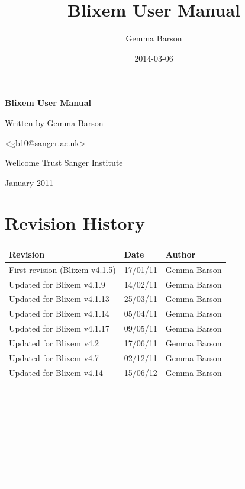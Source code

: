 \documentclass[letterpaper]{article}
\title{Blixem User Manual}
\author{Gemma Barson}
\date{2014-03-06}
\begin{document}
\setcounter{page}{1}\pagestyle{Standard}


\thispagestyle{FirstPage}
{\centering\sffamily\bfseries\color[rgb]{0.0,0.27058825,0.5254902}
\Huge\bf{Blixem User Manual}
\par}

\bigskip

{\centering
\large{Written by Gemma Barson}
\par}
{\centering
{\textless}\href{mailto:gb10@sanger.ac.uk}{gb10@sanger.ac.uk}{\textgreater}
\par}

\bigskip

{\centering
\large{Wellcome Trust Sanger Institute}
\par}
{ January 2011
\par}



\clearpage
{\color[rgb]{0.0,0.27058825,0.5254902}\section[Revision History]{Revision History}}
\hypertarget{RefHeading334316266717}{}
\bigskip

\begin{center}
\tablehead{}
\begin{supertabular}{|m{8.073cm}|m{3.2849998cm}|m{3.282cm}|}
\hline
\bfseries Revision &
\bfseries Date &
\bfseries Author\\\hline
 First revision (Blixem v4.1.5) &
 17/01/11 &
 Gemma Barson\\\hline
 Updated for Blixem v4.1.9 &
 14/02/11 &
 Gemma Barson\\\hline
 Updated for Blixem v4.1.13 &
 25/03/11 &
 Gemma Barson\\\hline
 Updated for Blixem v4.1.14 &
 05/04/11 &
 Gemma Barson\\\hline
 Updated for Blixem v4.1.17 &
 09/05/11 &
 Gemma Barson\\\hline
 Updated for Blixem v4.2 &
 17/06/11 &
 Gemma Barson\\\hline
 Updated for Blixem v4.7 &
 02/12/11 &
 Gemma Barson\\\hline
 Updated for Blixem v4.14 &
 15/06/12 &
 Gemma Barson\\\hline
~
 &
~
 &
~
\\\hline
~
 &
~
 &
~
\\\hline
~
 &
~
 &
~
\\\hline
~
 &
~
 &
~
\\\hline
~
 &
~
 &
~
\\\hline
~
 &
~
 &
~
\\\hline
~
 &
~
 &
~
\\\hline
\end{supertabular}
\end{center}
\end{document}
